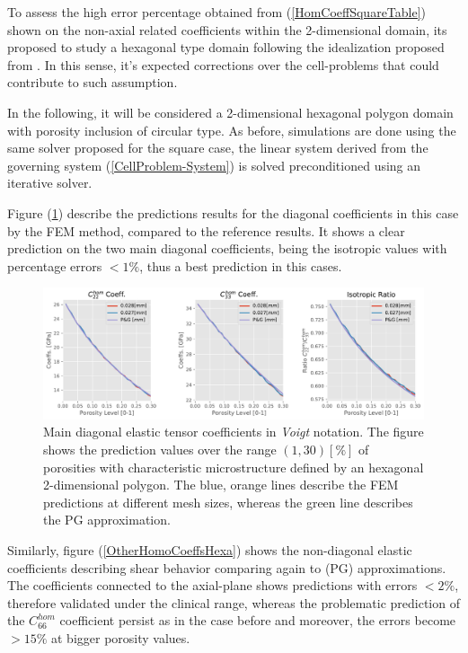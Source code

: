 To assess the high error percentage obtained from (\ref{HomCoeffSquareTable}) shown on the non-axial related coefficients within the 2-dimensional domain, its proposed to study a hexagonal type domain following the idealization proposed from \cite{Parnell2008}. In this sense, it's expected corrections over the cell-problems that could contribute to such assumption.

In the following, it will be considered a 2-dimensional hexagonal polygon domain with porosity inclusion of circular type. As before, simulations are done using the same solver proposed for the square case, the linear system derived from the governing system (\ref{CellProblem-System}) is solved preconditioned using an iterative solver.

Figure (\ref{MainHomCoeffHexa}) describe the predictions results for the diagonal coefficients in this case by the FEM method, compared to the reference results. It shows a clear prediction on the two main diagonal coefficients, being the isotropic values with percentage errors $< 1 \%$, thus a best prediction in this cases.
\begin{figure}[!h]
	\centering
	\includegraphics[scale=.5]{images/CellsProb/CellProb_MainHomCoeffsCircularHexa.pdf}
	\caption{Main diagonal elastic tensor coefficients in \textit{Voigt} notation. The figure shows the prediction values over the range $(1,30) [\%]$ of porosities with characteristic microstructure defined by an hexagonal 2-dimensional polygon. The blue, orange lines describe the FEM predictions at different mesh sizes, whereas the green line describes the PG approximation.}
	\label{MainHomCoeffHexa}
\end{figure}
Similarly, figure (\ref{OtherHomoCoeffsHexa}) shows the non-diagonal elastic coefficients describing shear behavior comparing again to (PG) approximations. The coefficients connected to the axial-plane shows predictions with errors $< 2 \%$, therefore validated under the clinical range, whereas the problematic prediction of the $C_{66}^{hom}$ coefficient persist as in the case before and moreover, the errors become $> 15 \%$ at bigger porosity values. 

